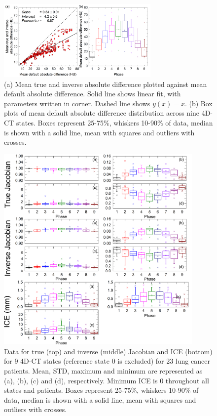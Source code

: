 \documentclass[type=dr, dr=rernat, accentcolor=tud7b,colorbacktitle, bigchapter, openright, twoside, 12pt ]{tudthesis}
\begin{document}
\begin{figure}[H]
	\begin{center}		
		\includegraphics[width=0.7\textwidth]{./Images/absDiff.png}
		\caption{(a) Mean true and inverse absolute difference plotted against mean default absolute difference. Solid line shows linear fit, with parameters
		written in corner. Dashed line shows $y(x)=x$. (b) Box plots of mean default absolute difference distribution across nine 4D-CT states. Boxes represent 25-75\%, whiskers 10-90\%
		of data, median is shown with a solid line, mean with squares and outliers with crosses.}
		\label{absDiff_lung}
	\end{center}
\end{figure}

\newpage

\begin{figure}[H]
	\begin{center}		
		\includegraphics[width=0.9\textwidth]{./Images/Jacobian_data.png}
		\caption{Data for true (top) and inverse (middle) Jacobian and ICE (bottom) for 9 4D-CT states (reference state 0 is excluded) for 23 lung cancer patients. Mean, STD, maximum and minimum are represented as (a), (b), (c) and (d), respectively.
		Minimum ICE is 0 throughout all states and patients. Boxes represent 25-75\%, whiskers 10-90\% of data, median is shown with a solid line, mean with squares and outliers with crosses.}
		\label{jacobian_data}
	\end{center}
\end{figure}
\end{document}
